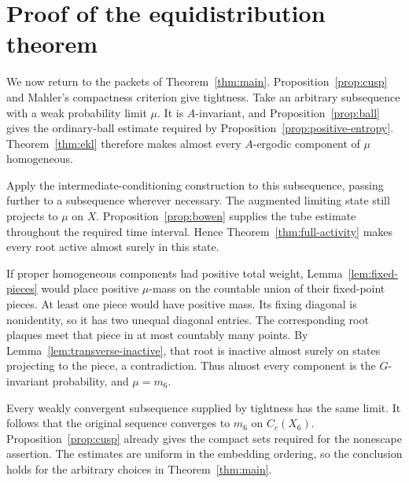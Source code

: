 \section{Proof of the equidistribution theorem}\label{sec:assembly}

We now return to the packets of Theorem~\ref{thm:main}.
Proposition~\ref{prop:cusp} and Mahler's compactness criterion give
tightness. Take an arbitrary subsequence with a weak probability limit
$\mu$. It is $A$-invariant, and Proposition~\ref{prop:ball} gives
the ordinary-ball estimate required by
Proposition~\ref{prop:positive-entropy}. Theorem~\ref{thm:ekl}
therefore makes almost every $A$-ergodic component of $\mu$
homogeneous.

Apply the intermediate-conditioning construction to this subsequence,
passing further to a subsequence wherever necessary. The augmented
limiting state still projects to $\mu$ on $X$.
Proposition~\ref{prop:bowen} supplies the tube estimate throughout
the required time interval. Hence
Theorem~\ref{thm:full-activity} makes every root active almost surely
in this state.

If proper homogeneous components had positive total weight,
Lemma~\ref{lem:fixed-pieces} would place positive $\mu$-mass on the
countable union of their fixed-point pieces. At least one piece would
have positive mass. Its fixing diagonal is nonidentity, so it has
two unequal diagonal entries. The corresponding root plaques meet
that piece in at most countably many points. By
Lemma~\ref{lem:transverse-inactive}, that root is inactive almost
surely on states projecting to the piece, a contradiction.
Thus almost every component is the $G$-invariant probability, and
$\mu=m_6$.

Every weakly convergent subsequence supplied by tightness has the same
limit. It follows that the original sequence converges to $m_6$ on
$C_c(X_6)$. Proposition~\ref{prop:cusp} already gives the compact sets
required for the nonescape assertion. The estimates are uniform in the
embedding ordering, so the conclusion holds for the arbitrary choices
in Theorem~\ref{thm:main}.
